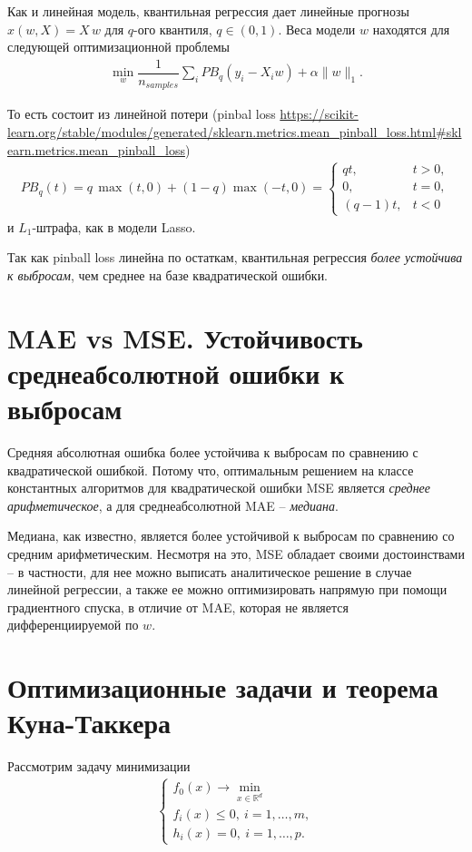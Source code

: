 \documentclass[%
	11pt,
	a4paper,
	utf8,
		]{article}
\begin{document}
Как и линейная модель, квантильная регрессия дает линейные прогнозы $ \hat{x}(w, X) = X \, w $ для $ q $-ого квантиля, $ q \in (0, 1) $. Веса модели $ w $ находятся для следующей оптимизационной проблемы
\begin{align*}
	\min_w \dfrac{1}{ n_{samples} } \sum_i PB_q (y_i - X_i w) + \alpha \| w \|_1.
\end{align*}

То есть состоит из линейной потери (pinbal loss \url{https://scikit-learn.org/stable/modules/generated/sklearn.metrics.mean_pinball_loss.html#sklearn.metrics.mean_pinball_loss})
\begin{align*}
	PB_q(t) = q \, \max(t, 0) + (1 - q) \max(-t, 0) = 
	\begin{cases}
		qt, & t > 0,\\[-3mm]
		0, & t = 0, \\[-3mm]
		(q - 1)t, & t < 0
	\end{cases}
\end{align*}
и $ L_1 $-штрафа, как в модели Lasso.

Так как pinball loss линейна по остаткам, квантильная регрессия \emph{более устойчива к выбросам}, чем среднее на базе квадратической ошибки.

\section{MAE vs MSE. Устойчивость среднеабсолютной ошибки к выбросам}

Средняя абсолютная ошибка более устойчива к выбросам по сравнению с квадратической ошибкой. Потому что, оптимальным решением на классе константных алгоритмов для квадратической ошибки MSE является \emph{среднее арифметическое}, а для среднеабсолютной MAE -- \emph{медиана}.

Медиана, как известно, является более устойчивой к выбросам по сравнению со средним арифметическим. Несмотря на это, MSE обладает своими достоинствами -- в частности, для нее можно выписать аналитическое решение в случае линейной регрессии, а также ее можно оптимизировать напрямую при помощи градиентного спуска, в отличие от MAE, которая не является дифференциируемой по $ w $. 

\section{Оптимизационные задачи и теорема Куна-Таккера}

Рассмотрим задачу минимизации
\begin{align}\label{eq:opt_task}
\begin{cases}
	f_0 (x) \rightarrow \min\limits_{ x \in \mathbb{R}^d }\\
	f_i(x) \leqslant 0, \ i = 1, \ldots, m,\\
	h_i(x) = 0, \ i = 1, \ldots, p.
\end{cases}
\end{align}
\end{document}
